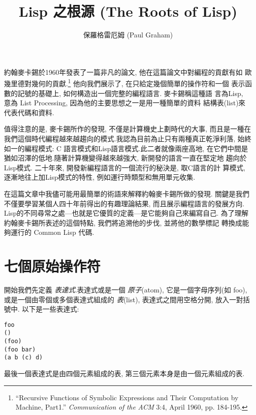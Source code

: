 \documentclass[12pt]{article}
\begin{document}
 
\begin{CJK}{UTF8}{bsmi} %
\title{Lisp 之根源 (The Roots of Lisp)} 
\author{保羅格雷厄姆 (Paul Graham)} 
\maketitle 
\newcommand{\pone}{$p_{1}$} 
\newcommand{\pn}{$p_{n}$} 
\newcommand{\aone}{$a_{1}$} 
\newcommand{\an}{$a_{n}$} 
\newcommand{\vone}{$v_{1}$} 
\newcommand{\vn}{$v_{n}$} 
\newcommand{\eone}{$e_{1}$} 
\newcommand{\en}{$e_{n}$} 
約翰麥卡錫於1960年發表了一篇非凡的論文, 他在這篇論文中對編程的貢獻有如 
歐幾里德對幾何的貢獻.\footnote{``Recursive Functions of Symbolic Expressions and Their Computation by Machine, Part1.'' 
{\it Communication of the ACM} 3:4, April 1960, pp. 184-195.} 
他向我們展示了, 在只給定幾個簡單的操作符和一個 
表示函數的記號的基礎上, 
如何構造出一個完整的編程語言. 
麥卡錫稱這種語 
言為Lisp, 
意為 
List 
Processing, 
因為他的主要思想之一是用一種簡單的資料 
結構表(list)來代表代碼和資料. 

值得注意的是, 麥卡錫所作的發現, 不僅是計算機史上劃時代的大事, 
而且是一種在我們這個時代編程越來越趨向的模式.我認為目前為止只有兩種真正乾淨利落, 
始終如一的編程模式: C 語言模式和Lisp語言模式.此二者就像兩座高地, 
在它們中間是猶如沼澤的低地.隨著計算機變得越來越強大, 新開發的語言一直在堅定地 
趨向於Lisp模式. 
二十年來, 開發新編程語言的一個流行的秘決是, 取C語言的計 
算模式, 逐漸地往上加Lisp模式的特性, 例如運行時類型和無用單元收集. 

在這篇文章中我儘可能用最簡單的術語來解釋約翰麥卡錫所做的發現. 
關鍵是我們不僅要學習某個人四十年前得出的有趣理論結果, 
而且展示編程語言的發展方向. 
Lisp的不同尋常之處---也就是它優質的定義---是它能夠自己來編寫自己. 
為了理解約翰麥卡錫所表述的這個特點, 我們將追溯他的步伐, 並將他的數學標記 
轉換成能夠運行的 Common Lisp 代碼. 

\section{七個原始操作符} 
開始我們先定義{\em 
表達式}.表達式或是一個{\em 
原子}(atom), 它是一個字母序列(如 
foo), 或是一個由零個或多個表達式組成的{\em 
表}(list), 
表達式之間用空格分開, 
放入一對括號中. 
以下是一些表達式: 
\begin{verbatim} 
foo 
() 
(foo) 
(foo bar) 
(a b (c) d) 
\end{verbatim} 
最後一個表達式是由四個元素組成的表, 
第三個元素本身是由一個元素組成的表. 


\end{CJK}
\end{document}
